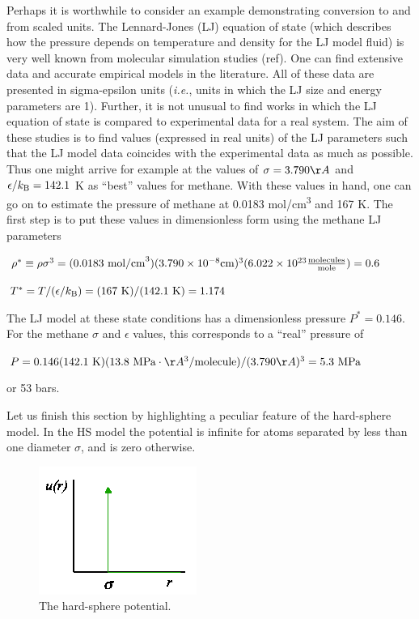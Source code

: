 \documentclass[]{article}
\begin{document}
Perhaps it is worthwhile to consider an example demonstrating conversion
to and from scaled units. The Lennard-Jones (LJ) equation of state (which describes how
the pressure depends on temperature and density for the LJ model fluid)
is very well known from molecular simulation studies (ref). One can find
extensive data and accurate empirical models in the literature. All of
these data are presented in sigma-epsilon units (\emph{i.e.}, units in
which the LJ size and energy parameters are 1). Further, it is not
unusual to find works in which the LJ equation of state is compared to
experimental data for a real system. The aim of these studies is to find
values (expressed in real units) of the LJ parameters such that the LJ
model data coincides with the experimental data as much as possible.
Thus one might arrive for example at the values of $\sigma = 3.790\AA$ and $\epsilon/k_{\rm B} =
142.1$ K as ``best'' values for methane. With
these values in hand, one can go on to estimate the pressure of methane
at 0.0183 mol/cm\textsuperscript{3} and 167 K. The first step is to put
these values in dimensionless form using the methane LJ parameters

$\rho^* \equiv \rho\sigma^3 = (0.0183~{\rm mol/cm}^3)(3.790 \times
10^{-8} {\rm cm})^3(6.022 \times 10^{23} \frac{{\rm molecules}}{{\rm mole}}) = 0.6$

$T^* = T/(\epsilon/k_{\rm B}) = (167~{\rm K})/(142.1~{\rm K}) = 1.174$

The LJ model at these state conditions has a dimensionless pressure $P^* =
0.146$. For the methane $\sigma$ and $\epsilon$ values, this corresponds to a ``real''
pressure of

$P = 0.146 (142.1~{\rm K})(13.8~{\rm MPa}\cdot\AA^{3}/{\rm molecule})/(3.790\AA)^{3} = 5.3~{\rm MPa}$

or 53 bars.

Let us finish this section by highlighting a peculiar feature of the
hard-sphere model. In the HS model the potential is infinite for atoms
separated by less than one diameter $\sigma$, and is zero otherwise.

\begin{figure}
  \centering
  \includegraphics[width=5 cm]{SimElements_figures/image001}
  \caption{\label{fig:HS} The hard-sphere potential.}
\end{figure}
\end{document}

